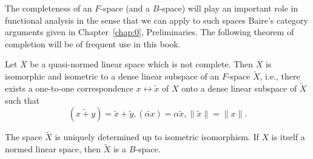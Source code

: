 \label{sec:I.10}

The completeness of an $F$-space (and a $B$-space) will play an important role in functional analysis in the sense that we can apply to such spaces Baire's category arguments given in Chapter~\ref{chap:0}, Preliminaries. The following theorem of completion will be of frequent use in this book. 

\begin{theoremn}[of completion] Let $X$ be a quasi-normed linear space which is not complete. Then $X$ is isomorphic and isometric to a dense linear subspace of an $F$-space $\tilde{X}$, i.e., there exists a one-to-one correspondence $x \leftrightarrow \tilde{x}$ of $X$ onto a dense linear subspace of $\tilde{X}$ such that
\begin{equation}\label{eq:I.10.1}
\left(\widetilde {x + y}\right) = \tilde {x} + \tilde {y}, (\widetilde {\alpha x}) = \alpha \tilde {x}, \| \tilde {x} \| = \| x \|.
\end{equation}

The space $\tilde{X}$ is uniquely determined up to isometric isomorphism. If $X$ is itself a normed linear space, then $\tilde{X}$ is a $B$-space. 

\end{theoremn}
